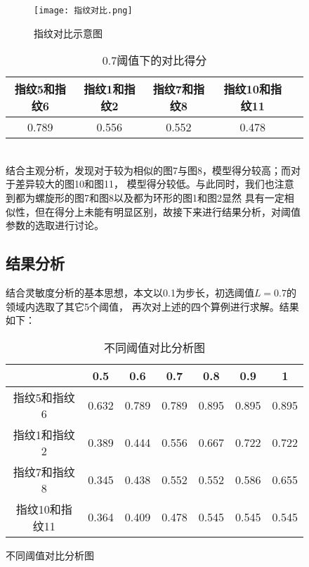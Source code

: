 \documentclass{whutmod}
\begin{document}
\begin{spacing}{1.2}
\begin{figure}[H]
\begin{figure}[H]
	\centering
	\texttt{[image: 指纹对比.png]}
	\caption{指纹对比示意图}
	\label{指纹对比}
\end{figure}

\begin{table}[H]
	\centering
	\setlength{\abovecaptionskip}{0pt}
	\caption{0.7阈值下的对比得分}
	  \begin{tabular}{ccccc}
		\\\toprule[1.5pt]
	   指纹5和指纹6 & 指纹1和指纹2 & 指纹7和指纹8 & 指纹10和指纹11 \\\hline
	   0.789  & 0.556  & 0.552  & 0.478  \\
	  \bottomrule[1.5pt]
	  \end{tabular}%
	\label{tab:addlabel}%
\end{table}%
  
~\\
结合主观分析，发现对于较为相似的图7与图8，模型得分较高；而对于差异较大的图10和图11，
模型得分较低。与此同时，我们也注意到都为螺旋形的图7和图8以及都为环形的图1和图2显然
具有一定相似性，但在得分上未能有明显区别，故接下来进行结果分析，对阈值参数的选取进行讨论。

\subsection{结果分析}
结合灵敏度分析的基本思想，本文以0.1为步长，初选阈值$L=0.7$的领域内选取了其它5个阈值，
再次对上述的四个算例进行求解。结果如下：
\begin{table}[H]
	\centering
	\setlength{\abovecaptionskip}{0pt}
	\caption{不同阈值对比分析图}
	\begin{tabular}{ccccccc}
		\\\toprule[1.5pt]
	   & 0.5 & 0.6 & 0.7 & 0.8 & 0.9 & 1 \\\hline
	   指纹5和指纹6 & 0.632  & 0.789  & 0.789  & 0.895  & 0.895  & 0.895  \\
	   指纹1和指纹2 & 0.389  & 0.444  & 0.556  & 0.667  & 0.722  & 0.722  \\
	   指纹7和指纹8 & 0.345  & 0.438  & 0.552  & 0.552  & 0.586  & 0.655  \\
	   指纹10和指纹11 & 0.364  & 0.409  & 0.478  & 0.545  & 0.545  & 0.545  \\
	  \bottomrule[1.5pt]
	  \end{tabular}%
	\label{tab:addlabel}%
\end{table}%
  

\end{figure}
\end{spacing}
\end{document}
